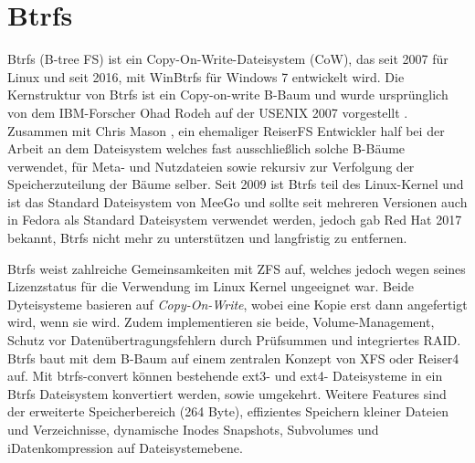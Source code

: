 \documentclass[11pt]{article}
\begin{document}
\section{Btrfs}
\label{Btrfs}
\par{
Btrfs (B-tree FS) ist ein Copy-On-Write-Dateisystem (CoW), das seit 2007 für Linux und seit 2016, mit WinBtrfs für Windows 7 entwickelt wird. Die Kernstruktur von Btrfs ist ein Copy-on-write B-Baum und wurde ursprünglich von dem IBM-Forscher Ohad Rodeh auf der USENIX 2007 vorgestellt \cite{rodeh2008b}. Zusammen mit Chris Mason \cite{mason2007btrfs}, ein ehemaliger ReiserFS Entwickler half bei der Arbeit an dem Dateisystem welches fast ausschließlich solche B-Bäume verwendet, für Meta- und Nutzdateien sowie rekursiv zur Verfolgung der Speicherzuteilung der Bäume selber\cite{rodeh2013btrfs}. Seit 2009 ist Btrfs teil des Linux-Kernel und ist das Standard Dateisystem von MeeGo und sollte seit mehreren Versionen auch in Fedora als Standard Dateisystem verwendet werden, jedoch gab Red Hat 2017 bekannt, Btrfs nicht mehr zu unterstützen und langfristig zu entfernen.
}
\par{
Btrfs weist zahlreiche Gemeinsamkeiten mit ZFS auf, welches jedoch wegen seines Lizenzstatus für die Verwendung im Linux Kernel ungeeignet war. Beide Dyteisysteme basieren auf \emph{Copy-On-Write}, wobei eine Kopie erst dann angefertigt wird, wenn sie wird. Zudem implementieren sie beide, Volume-Management, Schutz vor Datenübertragungsfehlern durch Prüfsummen und integriertes RAID. Btrfs baut mit dem B-Baum auf einem zentralen Konzept von XFS oder Reiser4 auf. Mit btrfs-convert können bestehende ext3- und ext4- Dateisysteme in ein Btrfs Dateisystem konvertiert werden, sowie umgekehrt. Weitere Features sind der erweiterte Speicherbereich (264 Byte), effizientes Speichern kleiner Dateien und Verzeichnisse, dynamische Inodes
Snapshots, Subvolumes und iDatenkompression auf Dateisystemebene.}
\end{document}
